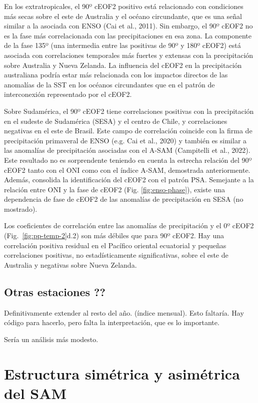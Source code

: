 \documentclass[12pt,oneside]{reedthesis}
\begin{document}
En los extratropicales, el 90º cEOF2 positivo está relacionado con condiciones más secas sobre el este de Australia y el océano circundante, que es una señal similar a la asociada con ENSO (Cai et al., 2011).
Sin embargo, el 90º cEOF2 no es la fase más correlacionada con las precipitaciones en esa zona.
La componente de la fase 135º (una intermedia entre las positivas de 90º y 180º cEOF2) está asociada con correlaciones temporales más fuertes y extensas con la precipitación sobre Australia y Nueva Zelanda.
La influencia del cEOF2 en la precipitación australiana podría estar más relacionada con los impactos directos de las anomalías de la SST en los océanos circundantes que en el patrón de interconexión representado por el cEOF2.

Sobre Sudamérica, el 90º cEOF2 tiene correlaciones positivas con la precipitación en el sudeste de Sudamérica (SESA) y el centro de Chile, y correlaciones negativas en el este de Brasil.
Este campo de correlación coincide con la firma de precipitación primaveral de ENSO (e.g. Cai et al., 2020) y también es similar a las anomalías de precipitación asociadas con el A-SAM (Campitelli et al., 2022).
Este resultado no es sorprendente teniendo en cuenta la estrecha relación del 90º cEOF2 tanto con el ONI como con el índice A-SAM, demostrada anteriormente.
Además, consolida la identificación del cEOF2 con el patrón PSA.
Semejante a la relación entre ONI y la fase de cEOF2 (Fig. \ref{fig:enso-phase}), existe una dependencia de fase de cEOF2 de las anomalías de precipitación en SESA (no mostrado).

Los coeficientes de correlación entre las anomalías de precipitación y el 0º cEOF2 (Fig.~\ref{fig:pp-temp-2}d.2) son más débiles que para 90º cEOF2.
Hay una correlación positiva residual en el Pacífico oriental ecuatorial y pequeñas correlaciones positivas, no estadísticamente significativas, sobre el este de Australia y negativas sobre Nueva Zelanda.

\hypertarget{otras-estaciones}{%
\section{Otras estaciones ??}\label{otras-estaciones}}

Definitivamente extender al resto del año.
(índice mensual).
Esto faltaría.
Hay código para hacerlo, pero falta la interpretación, que es lo importante.

Sería un análisis más modesto.

\hypertarget{estructura-simuxe9trica-y-asimuxe9trica-del-sam}{%
\chapter{Estructura simétrica y asimétrica del SAM}\label{estructura-simuxe9trica-y-asimuxe9trica-del-sam}}
\end{document}
